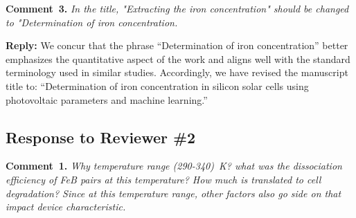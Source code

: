 \documentclass[a4paper,fleqn]{cas-sc}
\begin{document}

\vspace{1cm}
\noindent
\textcolor[rgb]{0.00,0.50,1.00}{\textbf{Comment~3.}}
\emph{In the title, "Extracting the iron concentration" should be changed to "Determination of iron concentration.}

\noindent
\textcolor[rgb]{0.51,0.00,0.00}{\textbf{Reply:}}
We concur that the phrase ``Determination of iron concentration'' better emphasizes the quantitative aspect
of the work and aligns well with the standard terminology used in similar studies.
Accordingly, we have revised the manuscript title to:
``Determination of iron concentration in silicon solar cells using photovoltaic parameters and machine learning.''


\vspace{1cm}
\subsection*{Response to Reviewer \#2 }

\noindent
\textcolor[rgb]{0.00,0.50,1.00}{\textbf{Comment~1.}}
\emph{Why temperature range (290-340)~K?
what was the dissociation efficiency of FeB pairs at this temperature?
How much is translated to cell degradation?
Since at this temperature range, other factors also go side on that impact device characteristic.}
\end{document}
